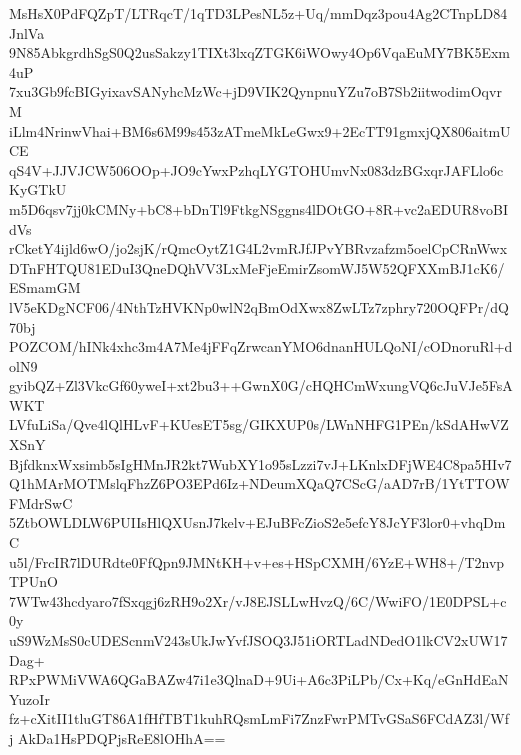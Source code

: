 MsHsX0PdFQZpT/LTRqcT/1qTD3LPesNL5z+Uq/mmDqz3pou4Ag2CTnpLD84JnlVa
9N85AbkgrdhSgS0Q2usSakzy1TIXt3lxqZTGK6iWOwy4Op6VqaEuMY7BK5Exm4uP
7xu3Gb9fcBIGyixavSANyhcMzWc+jD9VIK2QynpnuYZu7oB7Sb2iitwodimOqvrM
iLlm4NrinwVhai+BM6s6M99s453zATmeMkLeGwx9+2EcTT91gmxjQX806aitmUCE
qS4V+JJVJCW506OOp+JO9cYwxPzhqLYGTOHUmvNx083dzBGxqrJAFLlo6cKyGTkU
m5D6qsv7jj0kCMNy+bC8+bDnTl9FtkgNSggns4lDOtGO+8R+vc2aEDUR8voBIdVs
rCketY4ijld6wO/jo2sjK/rQmcOytZ1G4L2vmRJfJPvYBRvzafzm5oelCpCRnWwx
DTnFHTQU81EDuI3QneDQhVV3LxMeFjeEmirZsomWJ5W52QFXXmBJ1cK6/ESmamGM
lV5eKDgNCF06/4NthTzHVKNp0wlN2qBmOdXwx8ZwLTz7zphry720OQFPr/dQ70bj
POZCOM/hINk4xhc3m4A7Me4jFFqZrwcanYMO6dnanHULQoNI/cODnoruRl+dolN9
gyibQZ+Zl3VkcGf60yweI+xt2bu3++GwnX0G/cHQHCmWxungVQ6cJuVJe5FsAWKT
LVfuLiSa/Qve4lQlHLvF+KUesET5sg/GIKXUP0s/LWnNHFG1PEn/kSdAHwVZXSnY
BjfdknxWxsimb5sIgHMnJR2kt7WubXY1o95sLzzi7vJ+LKnlxDFjWE4C8pa5HIv7
Q1hMArMOTMslqFhzZ6PO3EPd6Iz+NDeumXQaQ7CScG/aAD7rB/1YtTTOWFMdrSwC
5ZtbOWLDLW6PUIIsHlQXUsnJ7kelv+EJuBFcZioS2e5efcY8JcYF3lor0+vhqDmC
u5l/FrcIR7lDURdte0FfQpn9JMNtKH+v+es+HSpCXMH/6YzE+WH8+/T2nvpTPUnO
7WTw43hcdyaro7fSxqgj6zRH9o2Xr/vJ8EJSLLwHvzQ/6C/WwiFO/1E0DPSL+c0y
uS9WzMsS0cUDEScnmV243sUkJwYvfJSOQ3J51iORTLadNDedO1lkCV2xUW17Dag+
RPxPWMiVWA6QGaBAZw47i1e3QlnaD+9Ui+A6c3PiLPb/Cx+Kq/eGnHdEaNYuzoIr
fz+cXitII1tluGT86A1fHfTBT1kuhRQsmLmFi7ZnzFwrPMTvGSaS6FCdAZ3l/Wfj
AkDa1HsPDQPjsReE8lOHhA==
